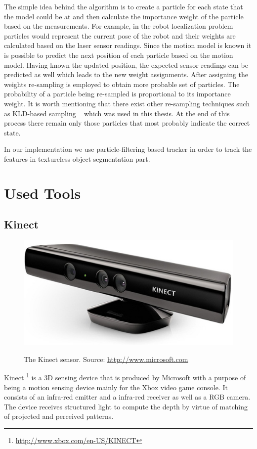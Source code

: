 The simple idea behind the algorithm is to create a particle for each state that the model could be at and then calculate the importance weight of the particle based on the measurements. For example, in the robot localization problem particles would represent the current pose of the robot and their weights are calculated based on the laser sensor readings. Since the motion model is known it is possible to predict the next position of each particle based on the motion model. Having known the updated position, the expected sensor readings can be predicted as well which leads to the new weight assignments. After assigning the weights re-sampling is employed to obtain more probable set of particles. The probability of a particle being re-sampled is proportional to its importance weight. It is worth mentioning that there exist other re-sampling techniques such as KLD-based sampling ~\cite{Fox01KLD} which was used in this thesis.  At the end of this process there remain only those particles that most probably indicate the correct state.

In our implementation we use particle-filtering based tracker in order to track the features in textureless object segmentation part.      



\section{Used Tools}
\subsection{Kinect}

\begin{figure}
\centering

{\includegraphics[width=0.5\columnwidth]{figures/kinect.jpg}}

\caption{The Kinect sensor. Source: \url{http://www.microsoft.com}}
\label{fig:kinect}
\end{figure}

Kinect \footnote{\url{http://www.xbox.com/en-US/KINECT}} is a 3D sensing device that is produced by Microsoft with a purpose of being a motion sensing device mainly for the Xbox video game console. It consists of an infra-red emitter and a infra-red receiver as well as a RGB camera. The device receives structured light to compute the depth by virtue of matching of projected and perceived patterns.

